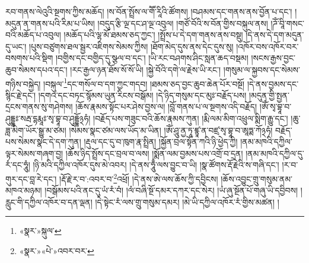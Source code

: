 རབ་གནས་ལེའུའི་སྔགས་ཀྱིས་མཆོད། །ས་བོན་སྤྲོས་ལ་གཽ་རཱིའི་ཚོགས། །བཤམས་དང་གནས་ནས་བྱོན་པ་དང་། །མདུན་ན་གནས་པའི་རིམ་པ་ཡིས། །བདུད་རྩི་ལྔ་དང་ཤ་ལྔ་འབུལ། །གཙོ་བོའི་ས་བོན་གྱིས་བསྐུལ་ནས། །ཌོཾ་བཱི་གསང་བའི་མཆོད་པ་འབུལ། །མཆོད་པའི་ལྷ་མོ་ཐམས་ཅད་ཀྱང་། །སྤྲོས་པ་དེ་དག་གནས་ནས་བསྡུ། །དེ་ནས་དེ་དག་མདུན་དུ་ཡང་། །པུས་བཙུགས་ཐལ་སྦྱར་འཇིགས་སེམས་ཀྱིས། །ཐོག་མེད་དུས་ནས་དེང་དུས་སུ། །འཁོར་བས་འཁོར་བར་བསགས་པའི་སྡིག །བགྱིས་དང་བགྱིད་དུ་སྩལ་བ་དང་། །ཡི་རང་བཤགས་ཤིང་སླན་ཆད་བསྡམ། །སངས་རྒྱས་བྱང་ཆུབ་སེམས་དཔའ་དང་། །རང་རྒྱལ་ཉན་ཐོས་སོ་སོ་ཡི། །སྐྱེ་བོའི་དགེ་ལ་རྗེས་ཡི་རང་། །གསུམ་ལ་སྐྱབས་དང་སེམས་གཉིས་བསྐྱེད། །བསྐུལ་\footnote{«སྣར་»སྐུལ་}དང་གསོལ་བ་དག་ཀྱང་གདབ། །ཐམས་ཅད་བྱང་ཆུབ་ཆེན་པོར་བསྔོ། །དེ་ནས་བྱམས་དང་སྙིང་རྗེ་དང་། །དགའ་དང་བཏང་སྙོམས་ཡུན་རིངས་བསྒོམ། །དེ་ཉིད་གསུམ་དང་མུཿ་བརྗོད་པས། །མདུན་གྱི་སྤྱན་དྲངས་གནས་སུ་གཤེགས། །ཆོས་རྣམས་སྟོང་པར་ཤེས་བྱས་ལ། །བློ་གནས་པ་ལ་སྔགས་འདི་བརྗོད། །ཨོཾ་སྭ་བྷཱ་བ་ཤུདྡྷཿ་སརྦ་དྷརྨཱཿ་སྭ་བྷཱ་བ་ཤུདྡྷོ྅ཧཾ། །བརྗོད་པས་གཟུང་བའི་ཆོས་རྣམས་ཀུན། །རྨི་ལམ་མིག་འཕྲུལ་སྨིག་རྒྱུ་དང་། །ཆུ་ཟླ་མིག་ཡོར་སྒྱུ་མ་ཙམ། །སེམས་སྣང་ཙམ་ལས་ཡོད་མ་ཡིན། །ཨོཾ་ཤཱུ་ནྱ་ཏཱ་ཛྙཱ་ན་བཛྲ་སྭ་བྷཱ་བ་ཨཱཏྨ་ཀོ྅ཧཾ། བརྗོད་པས་སེམས་སྣང་དེ་དག་ཀུན། །རྡུལ་དང་དུ་བ་ཁུག་རྣ་སྤྲིན། །སྐྱོན་བྲལ་སྟོན་ཀའི་ཉི་ཕྱེད་ཀྱི། །ནམ་མཁའི་དཀྱིལ་ལྟར་སེམས་གཞག་བྱ། །ཆོས་ཉིད་སྤྲོས་དང་བྲལ་བ་ལས། །སྨོན་ལམ་བྱམས་པས་འགྲོ་བ་དྲན། །ནམ་མཁའི་དཀྱིལ་དུ་རཾ་དང་ཧཱུཾ། །ཉི་མའི་དཀྱིལ་འཁོར་དུས་མེ་འབར། །དེ་ནས་ཧཱུྃ་ལས་བྱུང་བ་ཡི། །སྣ་ཚོགས་རྡོ་རྗེའི་ས་གཞི་དང་། །ར་བ་གུར་དང་བླ་རེ་དང་། །རྡོ་རྗེ་ར་བ་:འབར་བ་\footnote{«སྣར་»«པེ་»འབར་བར་}འཕྲོ། །དེ་ནས་ཨེ་ལས་ཆོས་ཀྱི་དབྱིངས། །ཆོས་འབྱུང་གྲུ་གསུམ་ནམ་མཁའ་མཉམ། །བསྒོམས་པའི་ནང་དུ་ཡཾ་རཾ་བཾ། །ལཾ་བཞི་སྔོ་དམར་དཀར་དང་སེར། །ཡཾ་ཞུ་སྔོན་པོ་གཞུ་ཡི་དབྱིབས། །རླུང་གི་དཀྱིལ་འཁོར་བ་དན་ལྡན། །དེ་སྟེང་རཾ་ལས་གྲུ་གསུམ་དམར། །མེ་ཡི་དཀྱིལ་འཁོར་རཾ་གྱིས་མཚན། །
